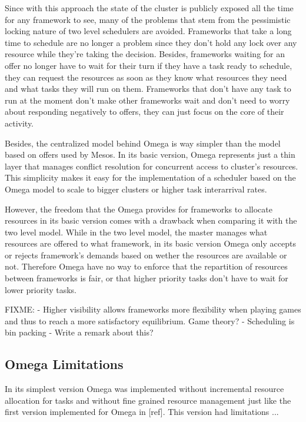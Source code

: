 \documentclass{svjour3}                     %
\begin{document}
Since with this approach the state of the cluster is publicly exposed all the
time for any framework to see, many of the problems that stem from the 
pessimistic locking nature of two level schedulers are avoided.  Frameworks
that take a long time to schedule are no longer a problem since they don't
hold any lock over any resource while they're taking the decision. Besides,
frameworks waiting for an offer no longer have to wait for their turn if they
have a task ready to schedule, they can request the resources as soon as they
know what resources they need and what tasks they will run on them. Frameworks
that don't have any task to run at the moment don't make other frameworks wait
and don't need to worry about responding negatively to offers, they can just
focus on the core of their activity.

Besides, the centralized model behind Omega is way simpler than the
model based on offers used by Mesos. In its basic version, Omega
represents just a thin layer that manages conflict resolution for
concurrent access to cluster's resources. This simplicity makes it
easy for the implementation of a scheduler based on the Omega model to
scale to bigger clusters or higher task interarrival rates.

However, the freedom that the Omega provides for frameworks to
allocate resources in its basic version comes with a drawback when
comparing it with the two level model. While in the two level model,
the master manages what resources are offered to what framework, in
its basic version Omega only accepts or rejects framework's demands
based on wether the resources are available or not.  Therefore Omega
have no way to enforce that the repartition of resources between
frameworks is fair, or that higher priority tasks don't have to wait
for lower priority tasks.

FIXME:
- Higher visibility allows frameworks more flexibility when playing 
games and thus to reach a more satisfactory equilibrium. Game theory?
- Scheduling is bin packing - Write a remark about this?

\subsection{Omega Limitations}

In its simplest version Omega was implemented without incremental
resource allocation for tasks and without fine grained resource
management just like the first version implemented for Omega in
[ref]. This version had limitations ...
\end{document}
